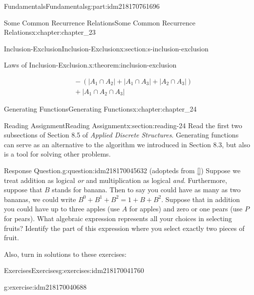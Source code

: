 \documentclass[oneside,10pt,]{book}
\newcommand{\xreffont}{\relax}
\numberwithin{equation}{section}
\begin{document}
\begin{partptx}{Fundamentals}{}{Fundamentals}{}{}{g:part:idm218170761696}
\begin{chapterptx}{Some Common Recurrence Relations}{}{Some Common Recurrence Relations}{}{}{x:chapter:chapter_23}
\begin{sectionptx}{Inclusion-Exclusion}{}{Inclusion-Exclusion}{}{}{x:section:s-inclusion-exclusion}
\begin{theorem}{Laws of Inclusion-Exclusion.}{}{x:theorem:inclusion-exclusion}
\begin{enumerate}[label=(\alph*)]
\begin{equation*}
\begin{split}
&\quad - (\lvert A_1 \cap A_2 \rvert + \lvert A_1 \cap A_3 \rvert+ \lvert A_2 \cap A_3 \rvert)\\
&\quad + \lvert A_1 \cap A_2 \cap A_3 \rvert
\end{split} 
\end{equation*}
%
\end{enumerate}
%
\end{theorem}
\end{sectionptx}
\end{chapterptx}
%
\typeout{************************************************}
\typeout{************************************************}
%
\begin{chapterptx}{Generating Functions}{}{Generating Functions}{}{}{x:chapter:chapter_24}
\index{}%
%
%
\typeout{************************************************}
\typeout{************************************************}
%
\begin{sectionptx}{Reading Assignment}{}{Reading Assignment}{}{}{x:section:reading-24}
Read the first two subsections of Section 8.5 of \emph{Applied Discrete Structures}. Generating functions can serve as an alternative to the algorithm we introduced in Section 8.3, but also is a tool for solving other problems.%
\begin{question}{Response Question.}{g:question:idm218170045632}%
(adopteds from \hyperlink{x:biblio:biblio-bogart-2017}{[{\xreffont 1}]}) Suppose we treat addition as logical \emph{or} and multiplication as logical \emph{and}.  Furthermore, suppose that \(B\) stands for banana.  Then to say you could have as many as two bananas, we could write \(B^0+B^1+B^2=1+B+B^2\).  Suppose that in addition you could have up to three apples (use \(A\) for apples) and zero or one pears (use \(P\) for pears).  What algebraic expression represents all your choices in selecting fruits?  Identify the part of this expression where you select exactly two pieces of fruit.%
\end{question}
Also, turn in solutions to these exercises:%
%
%
\typeout{************************************************}
\typeout{************************************************}
%
\begin{exercises-subsection-numberless}{Exercises}{}{Exercises}{}{}{g:exercises:idm218170041760}
\par\medskip\noindent%
%
\begin{exercisegroup}
\begin{divisionexerciseeg}{1}{}{}{g:exercise:idm218170040688}%

\end{divisionexerciseeg}
\end{exercisegroup}
\end{exercises-subsection-numberless}
\end{sectionptx}
\end{chapterptx}
\end{partptx}
\end{document}

